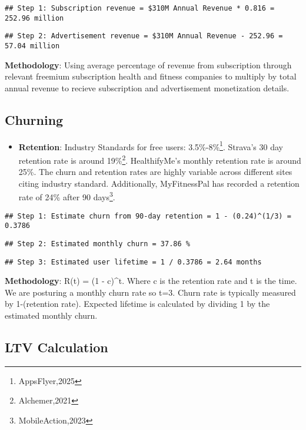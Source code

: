\documentclass[
]{article}
\providecommand{\tightlist}{%
  \setlength{\itemsep}{0pt}\setlength{\parskip}{0pt}}
\begin{document}
\begin{verbatim}
## Step 1: Subscription revenue = $310M Annual Revenue * 0.816 = 252.96 million
\end{verbatim}

\begin{verbatim}
## Step 2: Advertisement revenue = $310M Annual Revenue - 252.96 = 57.04 million
\end{verbatim}

\textbf{Methodology}: Using average percentage of revenue from
subscription through relevant freemium subscription health and fitness
companies to multiply by total annual revenue to recieve subscription
and advertisement monetization details.

\subsection{Churning}\label{churning}

\begin{itemize}
\tightlist
\item
  \textbf{Retention}: Industry Standards for free users:
  3.5\%-8\%\footnote{AppsFlyer,2025}. Strava's 30 day retention rate is
  around 19\%\footnote{Alchemer,2021}. HealthifyMe's monthly retention
  rate is around 25\%. The churn and retention rates are highly variable
  across different sites citing industry standard. Additionally,
  MyFitnessPal has recorded a retention rate of 24\% after 90
  days\footnote{MobileAction,2023}.
\end{itemize}

\begin{verbatim}
## Step 1: Estimate churn from 90-day retention = 1 - (0.24)^(1/3) = 0.3786
\end{verbatim}

\begin{verbatim}
## Step 2: Estimated monthly churn = 37.86 %
\end{verbatim}

\begin{verbatim}
## Step 3: Estimated user lifetime = 1 / 0.3786 = 2.64 months
\end{verbatim}

\textbf{Methodology}: R(t) = (1 - c)\^{}t. Where c is the retention rate
and t is the time. We are posturing a monthly churn rate so t=3. Churn
rate is typically measured by 1-(retention rate). Expected lifetime is
calculated by dividing 1 by the estimated monthly churn.

\subsection{LTV Calculation}\label{ltv-calculation}
\end{document}
